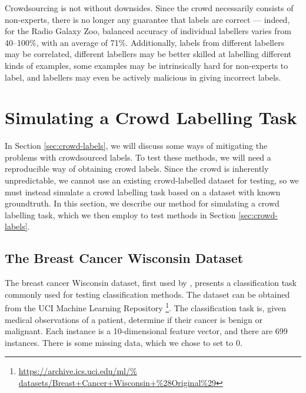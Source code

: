         Crowdsourcing is not without downsides. Since the crowd necessarily
        consists of non-experts, there is no longer any guarantee that labels
        are correct --- indeed, for the Radio Galaxy Zoo, balanced accuracy of
        individual labellers varies from 40--100\%, with an average of 71\%.
        Additionally, labels from different labellers may be correlated,
        different labellers may be better skilled at labelling different kinds
        of examples, some examples may be intrinsically hard for non-experts to
        label, and labellers may even be actively malicious in giving incorrect
        labels.


\section{Simulating a Crowd Labelling Task}
\label{sec:crowd-simulation}
    
    In Section \ref{sec:crowd-labels}, we will discuss some ways of mitigating
    the problems with crowdsourced labels. To test these methods, we will need a
    reproducible way of obtaining crowd labels. Since the crowd is inherently
    unpredictable, we cannot use an existing crowd-labelled dataset for testing,
    so we must instead simulate a crowd labelling task based on a dataset with
    known groundtruth. In this section, we describe our method for simulating a
    crowd labelling task, which we then employ to test methods in Section
    \ref{sec:crowd-labels}.

    \subsection{The Breast Cancer Wisconsin Dataset}
    \label{sec:breast-dataset}

        The breast cancer Wisconsin dataset, first used by
        \citeauthor{wolberg90}, presents a classification task commonly used for
        testing classification methods. The dataset can be obtained from the UCI
        Machine Learning Repository \citep{lichman13}
        \footnote{\url{https://archive.ics.uci.edu/ml/%
                       datasets/Breast+Cancer+Wisconsin+\%28Original\%29}}.
        The classification task is, given medical observations of a patient,
        determine if their cancer is benign or malignant. Each instance is a
        10-dimensional feature vector, and there are 699 instances. There is
        some missing data, which we chose to set to 0.

